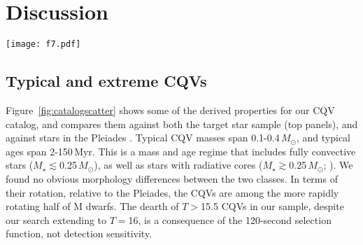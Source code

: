 \documentclass[11pt,twocolumn,tighten]{aastex63}
\begin{document}
\section{Discussion}
\label{sec:discussion}

\begin{figure*}[!t]
	\begin{center}
		\centering
		\texttt{[image: f7.pdf]}
		\vspace{-0.1cm}
		\caption{
      {\bf Properties of CQVs identified by our search}.
      CQVs are mostly pre-main-sequence M dwarfs, younger than
      $\approx$150 Myr, with rotation periods faster than
      $\approx$1\,day.  The \ngoods\ bonafide CQVs in
      Table~\ref{tab:thetable} are the dark blue circles; \nmaybes\
      ambiguous CQV candidates are light blue circles.  The top panels
      show the \nstarssearched\ target stars with 120-second cadence
      TESS data as the shaded gray background; darker regions
      correspond to a larger relative number of searched stars.  The
      lower-left panel compares the rotation--color distribution of
      CQVs against the rotation periods of K and M dwarfs in the
      Pleiades from \citet{2016AJ....152..114R}.  The lower-middle
      panel plots the derived corotation radii $R_{\rm cr} =
      (GM/\Omega^2)^{1/3}$ in units of stellar radii against the
      measured CQV periods, in units of hours.  Ages in the final
      panel are known from cluster membership.
		}
		\label{fig:catalogscatter}
	\end{center}
\end{figure*}


\subsection{Typical and extreme CQVs}
\label{subsec:extreme}

Figure~\ref{fig:catalogscatter} shows some of the derived properties
for our CQV catalog, and compares them against both the target star
sample (top panels), and against stars in the Pleiades
\citep{2016AJ....152..114R}.  Typical CQV masses span
0.1-0.4\,$M_\odot$, and typical ages span 2-150\,Myr.  This is a mass
and age regime that includes fully convective stars
($M_\star$$\lesssim$0.25\,$M_\odot$), as well as stars with radiative
cores ($M_\star$$\gtrsim$0.25\,$M_\odot$;
\citealt{2018A&A...619A.177B}).  We found no obvious morphology
differences between the two classes.  In terms of their rotation,
relative to the Pleiades, the CQVs are among the more rapidly rotating
half of M dwarfs.  The dearth of $T$$>$15.5 CQVs in our sample,
despite our search extending to $T$$=$16, is a consequence of the
120-second selection function, not detection sensitivity.
\end{document}
